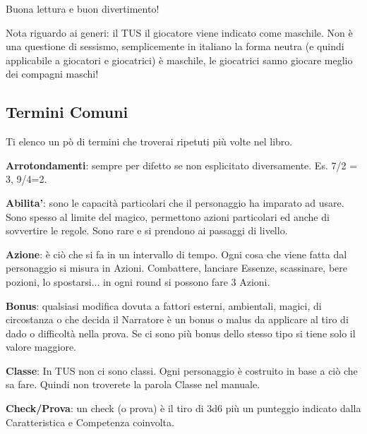\documentclass[a4paper,11pt,twoside,openany]{book}
\begin{document}
Buona lettura e buon divertimento!

Nota riguardo ai generi: il TUS il giocatore viene indicato come maschile. Non è una questione di sessismo, semplicemente in italiano la forma neutra (e quindi applicabile a giocatori e giocatrici) è maschile, le giocatrici sanno giocare meglio dei compagni maschi!




\pagebreak{}

\subsection{Termini Comuni}

Ti elenco un pò di termini che troverai ripetuti più volte nel libro.

\textbf{Arrotondamenti}: sempre per difetto se non esplicitato diversamente. Es. 7/2 = 3, 9/4=2.

\textbf{Abilita'}: sono le capacità particolari che il personaggio ha imparato ad usare. Sono spesso al limite del magico, permettono azioni particolari ed anche di sovvertire le regole. Sono rare e si prendono ai passaggi di livello.

\textbf{Azione}: è ciò che si fa in un intervallo di tempo. Ogni cosa che viene fatta dal personaggio si misura in Azioni. Combattere, lanciare Essenze, scassinare, bere pozioni, lo spostarsi... in ogni round si possono fare 3 Azioni.

\textbf{Bonus}: qualsiasi modifica dovuta a fattori esterni, ambientali, magici, di circostanza o che decida il Narratore è un bonus o malus da applicare al tiro di dado o difficoltà nella prova. Se ci sono più bonus dello stesso tipo si tiene solo il valore maggiore.

\textbf{Classe}: In TUS non ci sono classi. Ogni personaggio è costruito in base a ciò che sa fare. Quindi non troverete la parola Classe nel manuale.

\textbf{Check/Prova}: un check (o prova) è il tiro di 3d6 più un punteggio indicato dalla Caratteristica e Competenza coinvolta.
\end{document}
